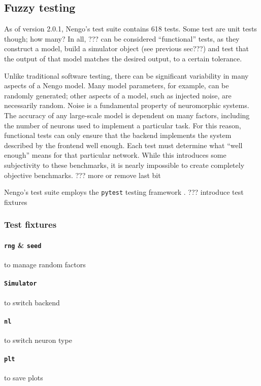 \documentclass{frontiersSCNS}
\begin{document}
\subsection{Fuzzy testing}

As of version 2.0.1, Nengo's test suite contains 618 tests.
Some test are unit tests though; how many?
In all, ??? can be considered ``functional'' tests,
as they construct a model,
build a simulator object (see previous sec???)
and test that the output of that model
matches the desired output,
to a certain tolerance.

Unlike traditional software testing,
there can be significant variability
in many aspects of a Nengo model.
Many model parameters, for example,
can be randomly generated;
other aspects of a model,
such as injected noise,
are necessarily random.
Noise is a fundamental property
of neuromorphic systems.
The accuracy of any large-scale model
is dependent on many factors,
including the number of neurons used
to implement a particular task.
For this reason,
functional tests can only
ensure that the backend implements
the system described by the frontend
well enough.
Each test must determine what
``well enough'' means for that particular network.
While this introduces some subjectivity
to these benchmarks,
it is nearly impossible to create
completely objective benchmarks.
??? more or remove last bit

Nengo's test suite employs the \texttt{pytest}
testing framework \cite{???}.
??? introduce test fixtures

\subsubsection{Test fixtures}

\paragraph{\texttt{rng} \& \texttt{seed}} to manage random factors

\paragraph{\texttt{Simulator}} to switch backend

\paragraph{\texttt{nl}} to switch neuron type

\paragraph{\texttt{plt}} to save plots
\end{document}

